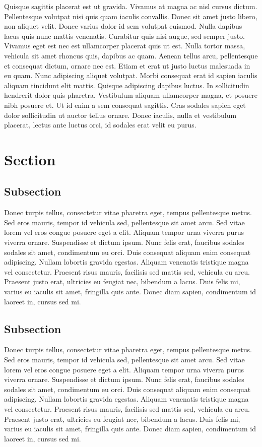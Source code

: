 \documentclass[11pt,a4paper]{article}
\begin{document}
Quisque sagittis placerat est ut gravida. Vivamus at magna ac nisl cursus dictum. Pellentesque volutpat nisi quis quam iaculis convallis. Donec sit amet justo libero, non aliquet velit. Donec varius dolor id sem volutpat euismod. Nulla dapibus lacus quis nunc mattis venenatis. Curabitur quis nisi augue, sed semper justo. Vivamus eget est nec est ullamcorper placerat quis ut est. Nulla tortor massa, vehicula sit amet rhoncus quis, dapibus ac quam. Aenean tellus arcu, pellentesque et consequat dictum, ornare nec est. Etiam et erat ut justo luctus malesuada in eu quam. Nunc adipiscing aliquet volutpat. Morbi consequat erat id sapien iaculis aliquam tincidunt elit mattis. Quisque adipiscing dapibus luctus. In sollicitudin hendrerit dolor quis pharetra. Vestibulum aliquam ullamcorper magna, et posuere nibh posuere et. Ut id enim a sem consequat sagittis. Cras sodales sapien eget dolor sollicitudin ut auctor tellus ornare. Donec iaculis, nulla et vestibulum placerat, lectus ante luctus orci, id sodales erat velit eu purus.

\section{Section}

\subsection{Subsection}

Donec turpis tellus, consectetur vitae pharetra eget, tempus pellentesque metus. Sed eros mauris, tempor id vehicula sed, pellentesque sit amet arcu. Sed vitae lorem vel eros congue posuere eget a elit. Aliquam tempor urna viverra purus viverra ornare. Suspendisse et dictum ipsum. Nunc felis erat, faucibus sodales sodales sit amet, condimentum eu orci. Duis consequat aliquam enim consequat adipiscing. Nullam lobortis gravida egestas. Aliquam venenatis tristique magna vel consectetur. Praesent risus mauris, facilisis sed mattis sed, vehicula eu arcu. Praesent justo erat, ultricies eu feugiat nec, bibendum a lacus. Duis felis mi, varius eu iaculis sit amet, fringilla quis ante. Donec diam sapien, condimentum id laoreet in, cursus sed mi.

\subsection{Subsection}

Donec turpis tellus, consectetur vitae pharetra eget, tempus pellentesque metus. Sed eros mauris, tempor id vehicula sed, pellentesque sit amet arcu. Sed vitae lorem vel eros congue posuere eget a elit. Aliquam tempor urna viverra purus viverra ornare. Suspendisse et dictum ipsum. Nunc felis erat, faucibus sodales sodales sit amet, condimentum eu orci. Duis consequat aliquam enim consequat adipiscing. Nullam lobortis gravida egestas. Aliquam venenatis tristique magna vel consectetur. Praesent risus mauris, facilisis sed mattis sed, vehicula eu arcu. Praesent justo erat, ultricies eu feugiat nec, bibendum a lacus. Duis felis mi, varius eu iaculis sit amet, fringilla quis ante. Donec diam sapien, condimentum id laoreet in, cursus sed mi.
\end{document}
